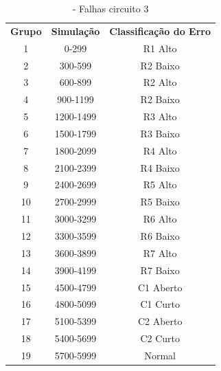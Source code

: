 \begin{enumerate}
 \begin{table}[H]
         \centering
        \begin{tabular}{ccc}
        \textbf{Grupo} & \textbf{Simulação} & \textbf{Classificação do Erro} \\
        1              & 0-299              & R1 Alto                        \\
        2              & 300-599            & R2 Baixo                       \\
        3              & 600-899            & R2 Alto                        \\
        4              & 900-1199           & R2 Baixo                       \\
        5              & 1200-1499          & R3 Alto                        \\
        6              & 1500-1799          & R3 Baixo                       \\
        7              & 1800-2099         & R4 Alto                        \\
        8              & 2100-2399          & R4 Baixo                       \\
        9              & 2400-2699          & R5 Alto                        \\
        10             & 2700-2999          & R5 Baixo                       \\
        11             & 3000-3299         & R6 Alto                        \\
        12              & 3300-3599          & R6 Baixo                       \\
        13              & 3600-3899          & R7 Alto                        \\
        14             & 3900-4199          & R7 Baixo                       \\
        15              & 4500-4799         & C1 Aberto                      \\
        16              & 4800-5099         & C1 Curto                       \\
        17              & 5100-5399         & C2 Aberto                      \\
        18               & 5400-5699        & C2 Curto                       \\
        19              & 5700-5999         & Normal                        
        \end{tabular}
        \caption{\label{tab:falhasckt3}- Falhas circuito 3}
\end{table}



\end{enumerate}
